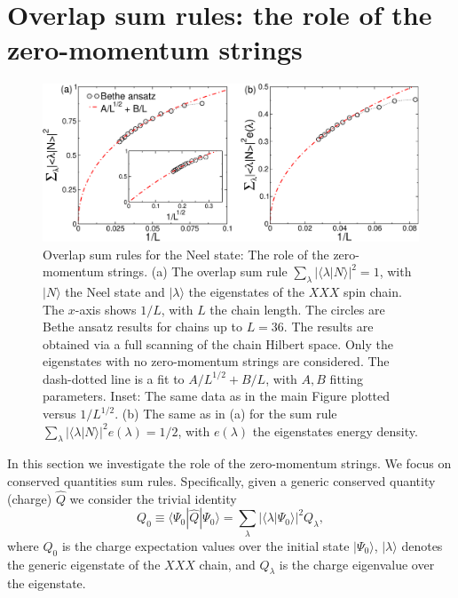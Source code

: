 \documentclass[11pt]{iopart}
\begin{document}
\section{Overlap sum rules: the role of the zero-momentum strings}
\label{ov-sum-rules}

\begin{figure}[t]
\begin{center}
\includegraphics[width=.9\textwidth]{./draft_figs/Neel}
\end{center}
\caption{ Overlap sum rules for the Neel state: The role of the zero-momentum 
 strings. (a) The overlap sum rule $\sum_{\lambda}|\langle\lambda|N\rangle|^2=1$, 
 with $|N\rangle$ the Neel state and $|\lambda\rangle$ the eigenstates  of 
 the $XXX$ spin chain. The $x$-axis shows $1/L$, with $L$ the chain length. 
 The circles are Bethe ansatz results for chains up to $L=36$. The results 
 are obtained via a full scanning of the chain Hilbert space. Only the 
 eigenstates with no zero-momentum strings are considered. The dash-dotted 
 line is a fit to $A/L^{1/2}+B/L$, with $A,B$ fitting parameters. Inset: 
 The same data as in the main Figure plotted versus $1/L^{1/2}$. (b) 
 The same as in (a) for the sum rule $\sum_{\lambda}|\langle
 \lambda|N\rangle|^2e(\lambda)=1/2$, with $e(\lambda)$  the 
 eigenstates energy density. 
}
\label{fig2-neel-sr}
\end{figure}

In this section we investigate the role of the zero-momentum strings. We focus on 
conserved quantities sum rules. Specifically, given a generic conserved quantity 
(charge) $\hat Q$ we consider the trivial identity  
%
\begin{equation}
\label{sum}
Q_0\equiv\langle\Psi_0|\hat Q|\Psi_0\rangle=\sum\limits_{\lambda}|\langle\lambda|
\Psi_0\rangle|^2Q_\lambda, 
\end{equation}
%
where $Q_0$ is the charge expectation values over the initial state $|\Psi_0
\rangle$, $|\lambda\rangle$ denotes the generic eigenstate of the $XXX$ chain, 
and $Q_\lambda$ is the charge eigenvalue over the eigenstate. 
\end{document}
